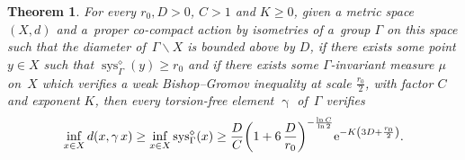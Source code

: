 \documentclass[10pt,a4paper]{amsart}
\numberwithin{equation}{section}
\newtheorem{theor}{Theorem}[section]
\newcommand{\sys}{\operatorname{sys}}
\newcommand{\g}{\operatorname{\gamma}}
\begin{document}
\begin{theor}\label{minorsystole}
For every $r_0, D >0$, $C > 1 $ and $K\ge 0$, given a metric space $(X,d)$ and a~proper co-compact action by isometries of a~group
$\Gamma $ on this space such that the diameter of~$\Gamma \backslash X$ is bounded above by $D$, if there exists some point $y\in X$ such that $\sys^{\diamond}_\Gamma (y) \ge r_0$ and if there exists some
$\Gamma$-invariant measure $\mu$ on~$X$ which verifies a weak Bishop--Gromov inequality at scale $\frac{r_0}{2}$, with factor $C$ and exponent $K$,
then every torsion-free element $\g$ of~$\Gamma$ verifies
\begin{gather*}
\inf_{x \in X} d(x, \g x) \ge \inf_{x \in X} \sys^{\diamond}_\Gamma (x)
\ge \frac{D}{C} \bigg( 1 + 6\, \frac{D}{r_0}\bigg)^{- \frac{\ln C}{\ln 2}} {\rm e}^{- K\left (3 D + \frac{r_0}{2}\right)}.
\end{gather*}
\end{theor}
\end{document}
